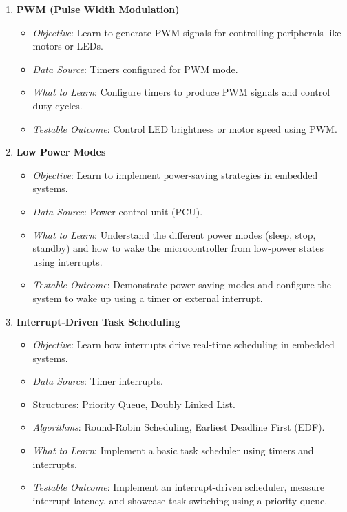 \documentclass{article}
\begin{document}
\begin{enumerate}[label=\arabic*.]
    \item \textbf{PWM (Pulse Width Modulation)}
    \begin{itemize}
        \item \textit{Objective}: Learn to generate PWM signals for controlling peripherals like motors or LEDs.
        \item \textit{Data Source}: Timers configured for PWM mode.
        \item \textit{What to Learn}: Configure timers to produce PWM signals and control duty cycles.
        \item \textit{Testable Outcome}: Control LED brightness or motor speed using PWM.
    \end{itemize}

    \item \textbf{Low Power Modes}
    \begin{itemize}
        \item \textit{Objective}: Learn to implement power-saving strategies in embedded systems.
        \item \textit{Data Source}: Power control unit (PCU).
        \item \textit{What to Learn}: Understand the different power modes (sleep, stop, standby) and how to wake the microcontroller from low-power states using interrupts.
        \item \textit{Testable Outcome}: Demonstrate power-saving modes and configure the system to wake up using a timer or external interrupt.
    \end{itemize}

    \item \textbf{Interrupt-Driven Task Scheduling}
    \begin{itemize}
        \item \textit{Objective}: Learn how interrupts drive real-time scheduling in embedded systems.
        \item \textit{Data Source}: Timer interrupts.
        \item \text Structures: Priority Queue, Doubly Linked List.
        \item \textit{Algorithms}: Round-Robin Scheduling, Earliest Deadline First (EDF).
        \item \textit{What to Learn}: Implement a basic task scheduler using timers and interrupts.
        \item \textit{Testable Outcome}: Implement an interrupt-driven scheduler, measure interrupt latency, and showcase task switching using a priority queue.
    \end{itemize}


\end{enumerate}
\end{document}

